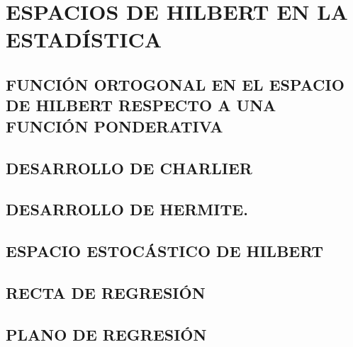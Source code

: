 \chapter{ESPACIOS DE HILBERT EN LA ESTADÍSTICA}

\section{FUNCIÓN ORTOGONAL EN EL ESPACIO DE HILBERT RESPECTO A UNA FUNCIÓN PONDERATIVA}

\section{DESARROLLO DE CHARLIER}

\section{DESARROLLO DE HERMITE.}

\section{ESPACIO ESTOCÁSTICO DE HILBERT}

\section{RECTA DE REGRESIÓN}
\section{PLANO DE REGRESIÓN}


